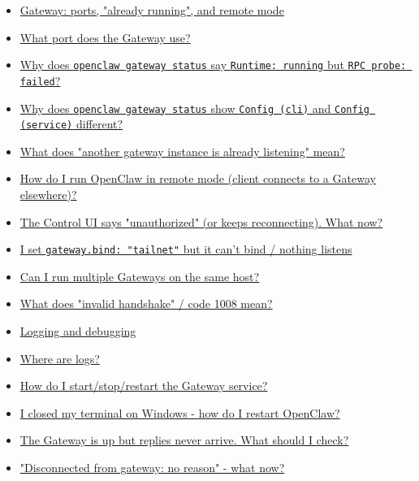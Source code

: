 \begin{itemize}
  \item \href{\#gateway-ports-already-running-and-remote-mode}{Gateway: ports, "already running", and remote mode}
  \item \href{\#what-port-does-the-gateway-use}{What port does the Gateway use?}
  \item \href{\#why-does-openclaw-gateway-status-say-runtime-running-but-rpc-probe-failed}{Why does \texttt{openclaw gateway status} say \texttt{Runtime: running} but \texttt{RPC probe: failed}?}
  \item \href{\#why-does-openclaw-gateway-status-show-config-cli-and-config-service-different}{Why does \texttt{openclaw gateway status} show \texttt{Config (cli)} and \texttt{Config (service)} different?}
  \item \href{\#what-does-another-gateway-instance-is-already-listening-mean}{What does "another gateway instance is already listening" mean?}
  \item \href{\#how-do-i-run-openclaw-in-remote-mode-client-connects-to-a-gateway-elsewhere}{How do I run OpenClaw in remote mode (client connects to a Gateway elsewhere)?}
  \item \href{\#the-control-ui-says-unauthorized-or-keeps-reconnecting-what-now}{The Control UI says "unauthorized" (or keeps reconnecting). What now?}
  \item \href{\#i-set-gatewaybind-tailnet-but-it-cant-bind-nothing-listens}{I set \texttt{gateway.bind: "tailnet"} but it can't bind / nothing listens}
  \item \href{\#can-i-run-multiple-gateways-on-the-same-host}{Can I run multiple Gateways on the same host?}
  \item \href{\#what-does-invalid-handshake-code-1008-mean}{What does "invalid handshake" / code 1008 mean?}
  \item \href{\#logging-and-debugging}{Logging and debugging}
  \item \href{\#where-are-logs}{Where are logs?}
  \item \href{\#how-do-i-startstoprestart-the-gateway-service}{How do I start/stop/restart the Gateway service?}
  \item \href{\#i-closed-my-terminal-on-windows-how-do-i-restart-openclaw}{I closed my terminal on Windows - how do I restart OpenClaw?}
  \item \href{\#the-gateway-is-up-but-replies-never-arrive-what-should-i-check}{The Gateway is up but replies never arrive. What should I check?}
  \item \href{\#disconnected-from-gateway-no-reason-what-now}{"Disconnected from gateway: no reason" - what now?}

\end{itemize}
